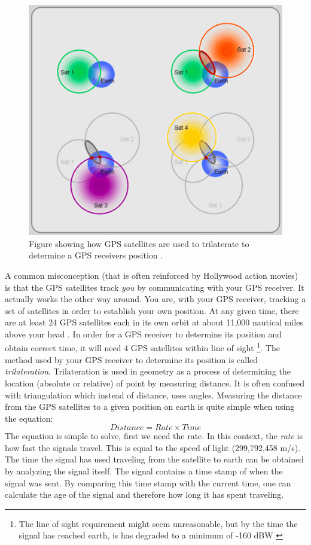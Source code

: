 \documentclass[12pt,english,a4paper]{article}
\begin{document}
\begin{figure}[hb]
  \centering
  \includegraphics[scale=0.4]{trilaterate.jpg}
  \caption[GPS trilaterate figure]
   {Figure showing how GPS satellites are used to trilaterate to determine a GPS receivers position \cite{GISTRILATERATE}.}
\end{figure}

A common misconception (that is often reinforced by Hollywood action movies) is that the GPS satellites track \textit{you} by communicating with your GPS receiver. It actually works the other way around. You are, with your GPS receiver, tracking a set of satellites in order to establish your own position. At any given time, there are at least 24 GPS satellites each in its own orbit at about 11,000 nautical miles above your head \cite{GPSGOVSS}. In order for a GPS receiver to determine its position and obtain correct time, it will need 4 GPS satellites within line of sight \footnote{The line of sight requirement might seem unreasonable, but by the time the signal has reached earth, is has degraded to a minimum of -160 dBW \cite{NATINT}}.
The method used by your GPS receiver to determine its position is called \textit{trilateration}. 
Trilateration is used in geometry as a process of determining the location (absolute or relative) of point by measuring distance. It is often confused with triangulation which instead of distance, uses angles. Measuring the distance from the GPS satellites to a given position on earth is quite simple when using the equation: 
\begin{equation} Distance = Rate \times Time \end{equation} 
The equation is simple to solve, first we need the rate. In this context, the \textit{rate} is how fast the signals travel. This is equal to the speed of light (299,792,458 m/s). The time the signal has used traveling from the satellite to earth can be obtained by analyzing the signal itself. The signal contains a time stamp of when the signal was sent. By comparing this time stamp with the current time, one can calculate the age of the signal and therefore how long it has spent traveling. \cite{GPSGOVTE}  
\end{document}
